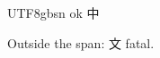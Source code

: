 \documentclass{article}
\begin{document}
\begin{CJK}{UTF8}{gbsn}
ok 中
\end{CJK}
Outside the span: 文 fatal.
\end{document}
